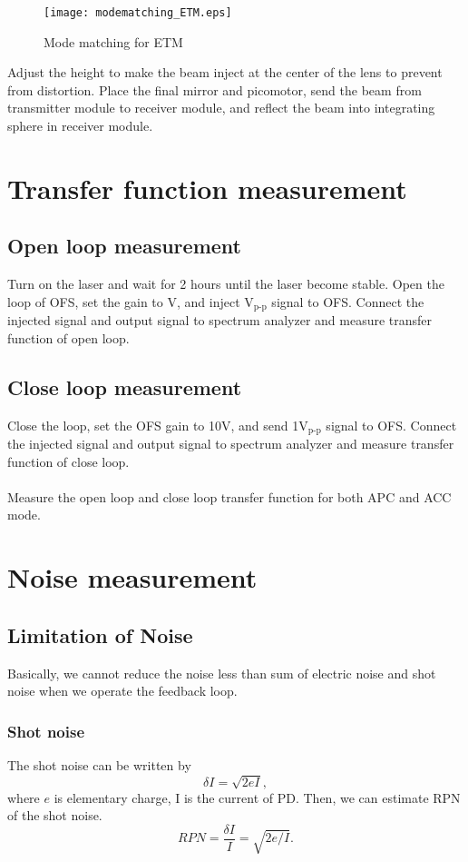 \begin{figure}
	\begin{center}
		\texttt{[image: modematching\_ETM.eps]}
		\caption{Mode matching for ETM}
		\label{fig:modematching_ETM} 
	\end{center}
\end{figure}

Adjust the height to make the beam inject at the center of the lens to prevent from distortion. Place the final mirror and picomotor, send the beam from transmitter module to receiver module, and reflect the beam into integrating sphere in receiver module.

\section{Transfer function measurement}
\subsection{Open loop measurement}
Turn on the laser and wait for 2 hours until the laser become stable. Open the loop of OFS, set the gain to \underline{\qquad} V, and inject \underline{\qquad} $\mbox{V}_{\mbox{p-p}}$ signal to OFS. Connect the injected signal and output signal to spectrum analyzer and measure transfer function of open loop.
\subsection{Close loop measurement}
Close the loop, set the OFS gain to 10V, and send 1$\mbox{V}_{\mbox{p-p}}$ signal to OFS. Connect the injected signal and output signal to spectrum analyzer and measure transfer function of close loop.
\\\\
\noindent Measure the open loop and close loop transfer function for both APC and ACC mode.

\section{Noise measurement}
\subsection{Limitation of Noise}
Basically, we cannot reduce the noise less than sum of electric noise and shot noise when we operate the feedback loop.
\subsubsection{Shot noise}
The shot noise can be written by
\begin{equation}
\delta I=\sqrt{2eI},
\end{equation}
where $e$ is elementary charge, I is the current of PD. Then, we can estimate RPN of the shot noise.
\begin{equation}
RPN=\frac{\delta I}{I}=\sqrt{2e/I}.
\end{equation}

